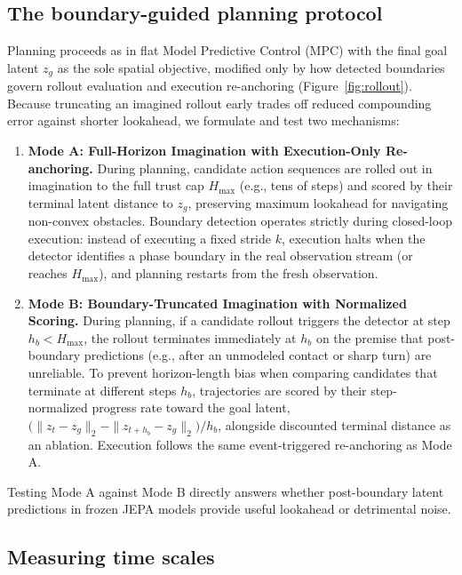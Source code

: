 \documentclass[11pt]{article}
\begin{document}
\subsection{The boundary-guided planning protocol}

Planning proceeds as in flat Model Predictive Control (MPC) with the final goal latent $z_g$ as the sole spatial objective, modified only by how detected boundaries govern rollout evaluation and execution re-anchoring (Figure~\ref{fig:rollout}). Because truncating an imagined rollout early trades off reduced compounding error against shorter lookahead, we formulate and test two mechanisms:

\begin{enumerate}[leftmargin=*, nosep]
    \item \textbf{Mode A: Full-Horizon Imagination with Execution-Only Re-anchoring.} During planning, candidate action sequences are rolled out in imagination to the full trust cap $H_{\max}$ (e.g., tens of steps) and scored by their terminal latent distance to $z_g$, preserving maximum lookahead for navigating non-convex obstacles. Boundary detection operates strictly during closed-loop execution: instead of executing a fixed stride $k$, execution halts when the detector identifies a phase boundary in the real observation stream (or reaches $H_{\max}$), and planning restarts from the fresh observation.
    \item \textbf{Mode B: Boundary-Truncated Imagination with Normalized Scoring.} During planning, if a candidate rollout triggers the detector at step $h_b < H_{\max}$, the rollout terminates immediately at $h_b$ on the premise that post-boundary predictions (e.g., after an unmodeled contact or sharp turn) are unreliable. To prevent horizon-length bias when comparing candidates that terminate at different steps $h_b$, trajectories are scored by their step-normalized progress rate toward the goal latent, $\big(\|z_t - z_g\|_2 - \|z_{t+h_b} - z_g\|_2\big)/h_b$, alongside discounted terminal distance as an ablation. Execution follows the same event-triggered re-anchoring as Mode A.
\end{enumerate}

Testing Mode A against Mode B directly answers whether post-boundary latent predictions in frozen JEPA models provide useful lookahead or detrimental noise.

\subsection{Measuring time scales}
\end{document}

